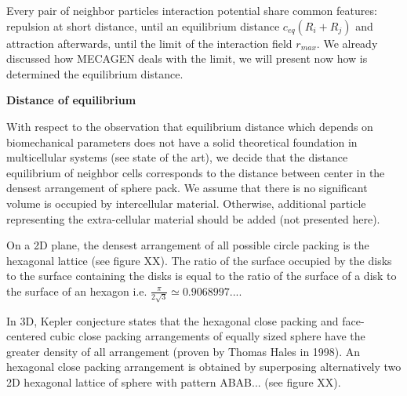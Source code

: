 Every pair of neighbor particles interaction potential share common features: repulsion at short distance, until an equilibrium distance $c_{eq} (R_i+R_j)$ and attraction afterwards, until the limit of the interaction field $r_{max} $. We already discussed how MECAGEN deals with the limit, we will present now how is determined the equilibrium distance.

\textbf{Distance of equilibrium}

With respect to the observation that equilibrium distance which depends on biomechanical parameters does not have a solid theoretical foundation in multicellular systems (see state of the art), we decide that the distance equilibrium of neighbor cells corresponds to the distance between center in the densest arrangement of sphere pack. We assume that there is no significant volume is occupied by intercellular material. Otherwise, additional particle representing the extra-cellular material should be added (not presented here).

On a 2D plane, the densest arrangement of all possible circle packing is the hexagonal lattice (see figure XX). The ratio of the surface occupied by the disks to the surface containing the disks is equal to the ratio of the surface of a disk to the surface of an hexagon i.e. $\frac{\pi}{ 2 \sqrt{3}} \simeq 0.9068997...$.

In 3D, Kepler conjecture states that the hexagonal close packing and face-centered cubic close packing arrangements of equally sized sphere have the greater density of all arrangement (proven by Thomas Hales in 1998). An hexagonal close packing arrangement is obtained by superposing alternatively two 2D hexagonal lattice of sphere with pattern ABAB... (see figure XX).

